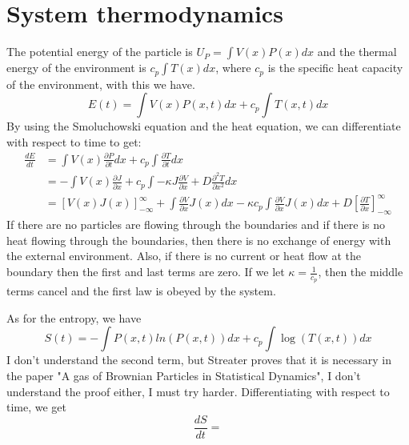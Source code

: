 \section{System thermodynamics}
The potential energy of the particle is $U_P = \int V(x) P(x) dx$ and the thermal energy of the environment is $c_p \int T(x) dx$, where $c_p$ is the specific heat capacity of the environment, with this we have.
\begin{equation}
E(t) = \int V(x)P(x, t) dx + c_p \int T(x, t) dx
\end{equation}
By using the Smoluchowski equation and the heat equation, we can differentiate with respect to time to get:
\begin{align}
\frac{d E}{d t} & = \int V(x) \frac{\partial P}{\partial t} dx + c_p \int \frac{\partial T}{\partial t} dx \\
 & = -\int V(x) \frac{\partial J}{\partial x} + c_p \int -\kappa J \frac{\partial V}{\partial x} + D \frac{\partial^2 T}{\partial x^2} dx \\
 & = [V(x)J(x)]_{-\infty}^\infty + \int \frac{\partial V}{\partial x} J(x) dx - \kappa c_p \int \frac{\partial V}{\partial x} J(x) dx + D \left [\frac{\partial T}{\partial x} \right]_{-\infty}^{\infty}
\end{align}
If there are no particles are flowing through the boundaries and if there is no heat flowing through the boundaries, then there is no exchange of energy with the external environment. Also, if there is no current or heat flow at the boundary then the first and last terms are zero. If we let $\kappa = \frac{1}{c_p}$, then the middle terms cancel and the first law is obeyed by the system.

As for the entropy, we have
$$ S(t) = -\int P(x, t) ln(P(x, t)) dx + c_p \int \log(T(x, t))dx $$
I don't understand the second term, but Streater proves that it is necessary in the paper "A gas of Brownian Particles in Statistical Dynamics", I don't understand the proof either, I must try harder. Differentiating with respect to time, we get
$$ \frac{d S}{d t} =  $$

